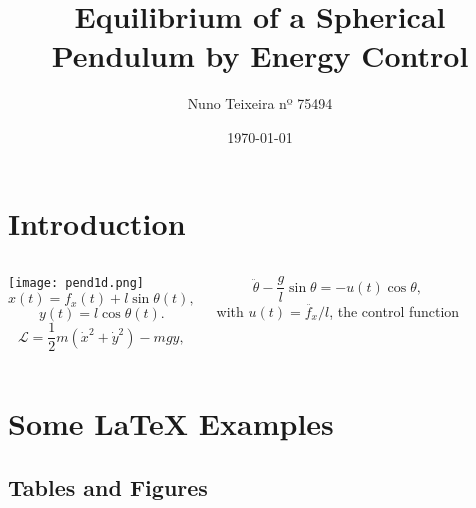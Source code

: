 \documentclass{beamer}
\title[Balance of a Spherical Pendulum]{Equilibrium of a Spherical Pendulum by Energy Control}
\author{Nuno Teixeira nº 75494}
\institute{Instituto Superior Técnico}
\date{\today}
\begin{document}
\begin{frame}
  \titlepage
\end{frame}


\section{Introduction}




\begin{frame}
       \begin{columns}
             \centering
             \texttt{[image: pend1d.png]}
             \begin{equation}
x(t)=f_x(t)+ l \sin{\theta}(t),
\label{x1d}
\end{equation}
\begin{equation}
y(t)= l \cos{\theta}(t).
\label{y1d}
\end{equation}
\begin{equation}
    \mathcal{L}=\frac{1}{2}m\left(\dot{x}^2+\dot{y}^2\right)-m g y,
    \label{l1d}
\end{equation}

\begin{equation}
    \ddot{\theta}-\frac{g}{l}\sin{\theta}=-u(t)\cos{\theta},
    \label{theta1d}
\end{equation}
with $u(t)=\ddot{f_x}/l$, the control function
\end{columns} 
\end{frame}



\section{Some \LaTeX{} Examples}

\subsection{Tables and Figures}
\end{document}
